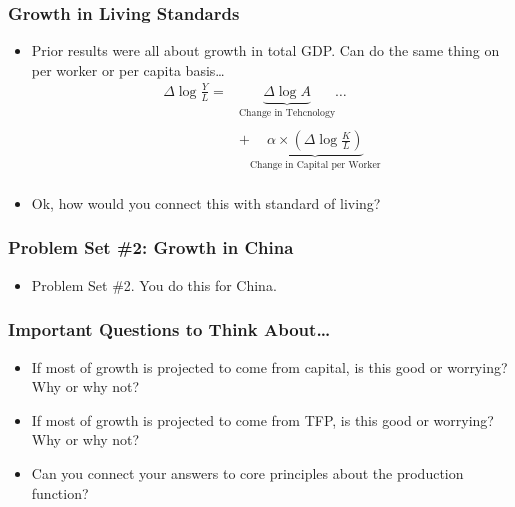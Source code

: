 \documentclass[handout]{beamer}
\begin{document}
\begin{frame}[t]
\frametitle{Growth in Living Standards}
\begin{itemize}
\item Prior results were all about growth in total GDP. Can do the same thing on per worker or per capita basis\ldots
\medskip
\begin{eqnarray*}
\Delta \log \frac{Y}{L} = & \underbrace{\Delta \log A}_{\mbox{Change in Tehcnology}} \dots \\
\\
& +  \underbrace{\alpha \times \left(\Delta \log \frac{K}{L} \right)}_{\mbox{Change in Capital per Worker}}\\
\end{eqnarray*}
\bigskip
\item Ok, how would you connect this with standard of living?
\end{itemize}
\end{frame}


\begin{frame}[t]
\frametitle{Problem Set \#2: Growth in China}
\begin{itemize}
\item Problem Set \#2. You do this for China.
\end{itemize}
\end{frame}



\begin{frame}[t]
\frametitle{Important Questions to Think About\ldots}
\begin{itemize}
\item If most of growth is projected to come from capital, is this good or worrying? Why or why not?
\bigskip
\item If most of growth is projected to come from TFP, is this good or worrying? Why or why not?
\bigskip
\item Can you connect your answers to core principles about the production function?
\end{itemize}
\end{frame}

\end{document}
